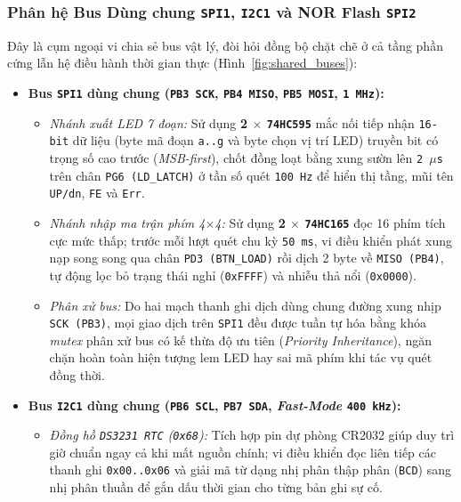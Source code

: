 \subsubsection{Phân hệ Bus Dùng chung \texttt{SPI1}, \texttt{I2C1} và NOR Flash \texttt{SPI2}}
Đây là cụm ngoại vi chia sẻ bus vật lý, đòi hỏi đồng bộ chặt chẽ ở cả tầng phần cứng lẫn hệ điều hành thời gian thực (Hình~\ref{fig:shared_buses}):
\begin{itemize}[nosep]
    \item \textbf{Bus \texttt{SPI1} dùng chung (\texttt{PB3 SCK}, \texttt{PB4 MISO}, \texttt{PB5 MOSI}, \texttt{1~MHz}):}
    \begin{itemize}[nosep]
        \item \textit{Nhánh xuất LED 7 đoạn:} Sử dụng \textbf{2 $\times$ \texttt{74HC595}} mắc nối tiếp nhận \texttt{16-bit} dữ liệu (byte mã đoạn \texttt{a..g} và byte chọn vị trí LED) truyền bit có trọng số cao trước (\textit{MSB-first}), chốt đồng loạt bằng xung sườn lên \texttt{2~$\mu$s} trên chân \texttt{PG6 (LD\_LATCH)} ở tần số quét \texttt{100~Hz} để hiển thị tầng, mũi tên \texttt{UP/dn}, \texttt{FE} và \texttt{Err}.
        \item \textit{Nhánh nhập ma trận phím 4$\times$4:} Sử dụng \textbf{2 $\times$ \texttt{74HC165}} đọc 16 phím tích cực mức thấp; trước mỗi lượt quét chu kỳ \texttt{50~ms}, vi điều khiển phát xung nạp song song qua chân \texttt{PD3 (BTN\_LOAD)} rồi dịch 2 byte về \texttt{MISO (PB4)}, tự động lọc bỏ trạng thái nghỉ (\texttt{0xFFFF}) và nhiễu thả nổi (\texttt{0x0000}).
        \item \textit{Phân xử bus:} Do hai mạch thanh ghi dịch dùng chung đường xung nhịp \texttt{SCK (PB3)}, mọi giao dịch trên \texttt{SPI1} đều được tuần tự hóa bằng khóa \textit{mutex} phân xử bus có kế thừa độ ưu tiên (\textit{Priority Inheritance}), ngăn chặn hoàn toàn hiện tượng lem LED hay sai mã phím khi tác vụ quét đồng thời.
    \end{itemize}
    \item \textbf{Bus \texttt{I2C1} dùng chung (\texttt{PB6 SCL}, \texttt{PB7 SDA}, \textit{Fast-Mode} \texttt{400~kHz}):}
    \begin{itemize}[nosep]
        \item \textit{Đồng hồ \texttt{DS3231 RTC} (\texttt{0x68}):} Tích hợp pin dự phòng CR2032 giúp duy trì giờ chuẩn ngay cả khi mất nguồn chính; vi điều khiển đọc liên tiếp các thanh ghi \texttt{0x00..0x06} và giải mã từ dạng nhị phân thập phân (\texttt{BCD}) sang nhị phân thuần để gắn dấu thời gian cho từng bản ghi sự cố.

\end{itemize}
\end{itemize}
